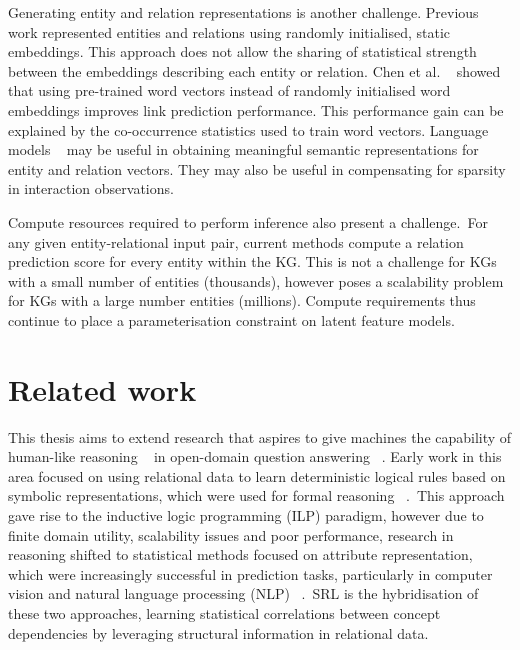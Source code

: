 \noindent Generating entity and relation representations is another challenge. Previous work represented entities and relations using randomly initialised, static embeddings. This approach does not allow the sharing of statistical strength between the embeddings describing each entity or relation. Chen et al. \unskip~\citep{socher2013reasoning} showed that using pre-trained word vectors instead of randomly initialised word embeddings improves link prediction performance. This performance gain can be explained by the co-occurrence statistics used to train word vectors. Language models \unskip~\citep{ bojanowski2016enriching, vaswani2017attention} may be useful in obtaining meaningful semantic representations for entity and relation vectors. They may also be useful in compensating for sparsity in interaction observations. \par

\noindent Compute resources required to perform inference also present a challenge.\ For any given entity-relational input pair, current methods compute a relation prediction score for every entity within the KG. This is not a challenge for KGs with a small number of entities (thousands), however poses a scalability problem for KGs with a large number entities (millions). Compute requirements thus continue to place a parameterisation constraint on latent feature models. 



\section{Related work} %

\noindent This thesis aims to extend research that aspires to give machines the capability of human-like reasoning \unskip~\citep{bordes2011learning} in open-domain question answering \unskip~\citep{hakimov2019evaluating}. Early work in this area focused on using relational data to learn deterministic logical rules based on symbolic representations, which were used for formal reasoning \unskip~\citep{hohenecker2017deep}.\ This approach gave rise to the inductive logic programming (ILP) paradigm, however due to finite domain utility, scalability issues and poor performance, research in reasoning shifted to statistical methods focused on attribute representation, which were increasingly successful in prediction tasks, particularly in computer vision and natural language processing (NLP) \unskip~\citep{koller2007introduction}.\ SRL is the hybridisation of these two approaches, learning statistical correlations between concept dependencies by leveraging structural information in relational data. \par

